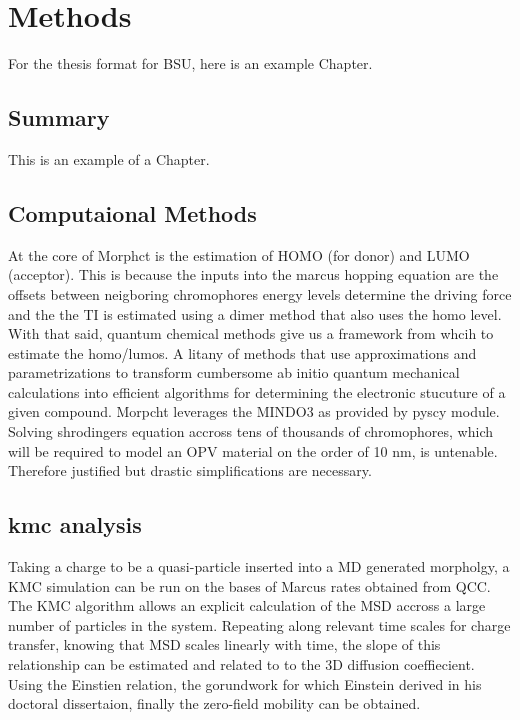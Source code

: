 \chapter{Methods}
\label{chap:methods}

For the thesis format for BSU, here is an example Chapter.

\section{Summary}
 
This is an example of a Chapter. 

\section{Computaional Methods}

At the core of Morphct is the estimation of HOMO (for donor) and LUMO (acceptor). This is because 
the inputs into the marcus hopping equation are the offsets between neigboring  chromophores energy levels
determine the driving force and the the TI is estimated using a dimer method that also uses the homo level. 
With that said, quantum chemical methods give us a framework from whcih to estimate the homo/lumos. A litany of
methods that use approximations and parametrizations to transform cumbersome ab initio quantum mechanical 
calculations into efficient algorithms for determining the electronic stucuture of a given compound. Morpcht 
leverages the MINDO3 as provided by pyscy module. Solving shrodingers equation accross tens of thousands of 
chromophores, which will be required to model an OPV material on the order of 10 nm, is untenable. Therefore
justified but drastic simplifications are necessary. 

\section{\nobreak kmc analysis}
Taking a charge to be a quasi-particle inserted into a MD generated morpholgy, a KMC
simulation can be run on the bases of Marcus rates obtained from QCC.
The KMC algorithm allows an explicit calculation of the MSD accross a large number of 
particles in the system. Repeating along relevant time scales for 
charge transfer, knowing that MSD scales linearly with time, the slope of this relationship
can be estimated and related to to the 3D diffusion coeffiecient. Using the Einstien relation, 
the gorundwork for which Einstein derived in his doctoral dissertaion, finally the zero-field
mobility can be obtained. 

